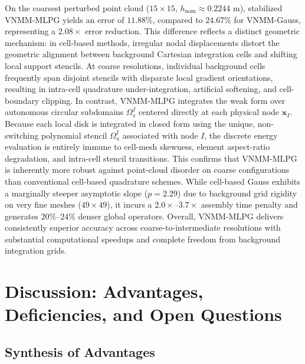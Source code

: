 \documentclass[preprint,12pt]{elsarticle}
\begin{document}
\begin{enumerate}
    On the coarsest perturbed point cloud ($15 \times 15$, $h_{\mathrm{nom}} \approx 0.2244\text{ m}$), stabilized VNMM-MLPG yields an error of $11.88\%$, compared to $24.67\%$ for VNMM-Gauss, representing a $2.08\times$ error reduction. This difference reflects a distinct geometric mechanism: in cell-based methods, irregular nodal displacements distort the geometric alignment between background Cartesian integration cells and shifting local support stencils. At coarse resolutions, individual background cells frequently span disjoint stencils with disparate local gradient orientations, resulting in intra-cell quadrature under-integration, artificial softening, and cell-boundary clipping. In contrast, VNMM-MLPG integrates the weak form over autonomous circular subdomains $\Omega_s^I$ centered directly at each physical node $\mathbf{x}_I$. Because each local disk is integrated in closed form using the unique, non-switching polynomial stencil $\Omega_u^I$ associated with node $I$, the discrete energy evaluation is entirely immune to cell-mesh skewness, element aspect-ratio degradation, and intra-cell stencil transitions. This confirms that VNMM-MLPG is inherently more robust against point-cloud disorder on coarse configurations than conventional cell-based quadrature schemes. While cell-based Gauss exhibits a marginally steeper asymptotic slope ($p = 2.29$) due to background grid rigidity on very fine meshes ($49\times 49$), it incurs a $2.0\times\text{--}3.7\times$ assembly time penalty and generates $20\%\text{--}24\%$ denser global operators. Overall, VNMM-MLPG delivers consistently superior accuracy across coarse-to-intermediate resolutions with substantial computational speedups and complete freedom from background integration grids.
\end{enumerate}

\section{Discussion: Advantages, Deficiencies, and Open Questions}
\label{sec:discussion}

\subsection{Synthesis of Advantages}
\label{subsec:advantages_synthesis}
\end{document}
